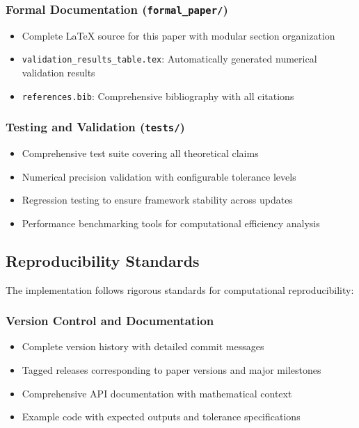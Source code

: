 \subsubsection{Formal Documentation (\texttt{formal\_paper/})}

\begin{itemize}
\item Complete LaTeX source for this paper with modular section organization
\item \texttt{validation\_results\_table.tex}: Automatically generated numerical validation results
\item \texttt{references.bib}: Comprehensive bibliography with all citations
\end{itemize}

\subsubsection{Testing and Validation (\texttt{tests/})}

\begin{itemize}
\item Comprehensive test suite covering all theoretical claims
\item Numerical precision validation with configurable tolerance levels
\item Regression testing to ensure framework stability across updates
\item Performance benchmarking tools for computational efficiency analysis
\end{itemize}

\subsection{Reproducibility Standards}
\label{subsec:reproducibility}

The implementation follows rigorous standards for computational reproducibility:

\subsubsection{Version Control and Documentation}

\begin{itemize}
\item Complete version history with detailed commit messages
\item Tagged releases corresponding to paper versions and major milestones
\item Comprehensive API documentation with mathematical context
\item Example code with expected outputs and tolerance specifications
\end{itemize}

